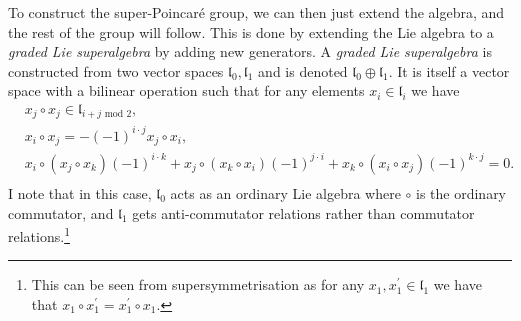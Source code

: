 \documentclass[../main.tex]{subfiles}
\begin{document}
To construct the super-Poincaré group, we can then just extend the algebra, and the rest of the group will follow.
This is done by extending the Lie algebra to a \emph{graded Lie superalgebra} by adding new generators.
A \emph{graded Lie superalgebra} is constructed from two vector spaces \(\mathfrak{l}_0, \mathfrak{l}_1\) and is denoted \(\mathfrak{l}_0 \oplus \mathfrak{l}_1\).
It is itself a vector space with a bilinear operation such that for any elements \(x_i \in \mathfrak{l}_i\) we have
\begin{align}
   & x_j \circ x_j \in \mathfrak{l}_{i+j \text{ mod } 2}, \tag{grading}                                                                     \\
  \label{susy:eq:supersymmetrisation}
   & x_i \circ x_j = -(-1)^{i\cdot j} x_j \circ x_i, \tag{supersymmetrisation}                                                              \\
  \nonumber
   & x_i \circ (x_j \circ x_k) (-1)^{i\cdot k} + x_j \circ (x_k \circ x_i) (-1)^{j \cdot i} + x_k\circ (x_i \circ x_j) (-1)^{k\cdot j} = 0. \\
  \tag{generalised Jacobi identity}
\end{align}
I note that in this case, \(\mathfrak{l}_0\) acts as an ordinary Lie algebra where \(\circ\) is the ordinary commutator, and \(\mathfrak{l}_1\) gets anti-commutator relations rather than commutator relations.\footnote{This can be seen from supersymmetrisation as for any \(x_1, x_1^\prime \in \mathfrak{l}_1\) we have that \(x_1 \circ x_1^\prime = x_1^\prime \circ x_1\).}
\end{document}
